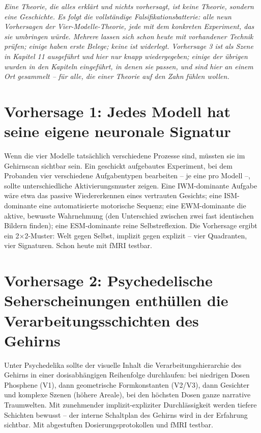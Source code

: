 \documentclass[11pt, twoside, openright]{book}
\begin{document}
\textit{Eine Theorie, die alles erklärt und nichts vorhersagt, ist keine Theorie, sondern eine Geschichte. Es folgt die vollständige Falsifikationsbatterie: alle neun Vorhersagen der Vier-Modelle-Theorie, jede mit dem konkreten Experiment, das sie umbringen würde. Mehrere lassen sich schon heute mit vorhandener Technik prüfen; einige haben erste Belege; keine ist widerlegt. Vorhersage 3 ist als Szene in Kapitel 11 ausgeführt und hier nur knapp wiedergegeben; einige der übrigen wurden in den Kapiteln eingeführt, in denen sie passen, und sind hier an einem Ort gesammelt -- für alle, die einer Theorie auf den Zahn fühlen wollen.}

\section*{Vorhersage 1: Jedes Modell hat seine eigene neuronale Signatur}

Wenn die vier Modelle tatsächlich verschiedene Prozesse sind, müssten sie im Gehirnscan sichtbar sein. Ein geschickt aufgebautes Experiment, bei dem Probanden vier verschiedene Aufgabentypen bearbeiten -- je eine pro Modell --, sollte unterschiedliche Aktivierungsmuster zeigen. Eine IWM-dominante Aufgabe wäre etwa das passive Wiedererkennen eines vertrauten Gesichts; eine ISM-dominante eine automatisierte motorische Sequenz; eine EWM-dominante die aktive, bewusste Wahrnehmung (den Unterschied zwischen zwei fast identischen Bildern finden); eine ESM-dominante reine Selbstreflexion. Die Vorhersage ergibt ein 2×2-Muster: Welt gegen Selbst, implizit gegen explizit -- vier Quadranten, vier Signaturen. Schon heute mit fMRI testbar.

\section*{Vorhersage 2: Psychedelische Seherscheinungen enthüllen die Verarbeitungsschichten des Gehirns}

Unter Psychedelika sollte der visuelle Inhalt die Verarbeitungshierarchie des Gehirns in einer dosisabhängigen Reihenfolge durchlaufen: bei niedrigen Dosen Phosphene (V1), dann geometrische Formkonstanten (V2/V3), dann Gesichter und komplexe Szenen (höhere Areale), bei den höchsten Dosen ganze narrative Traumwelten. Mit zunehmender implizit-expliziter Durchlässigkeit werden tiefere Schichten bewusst -- der interne Schaltplan des Gehirns wird in der Erfahrung sichtbar. Mit abgestuften Dosierungsprotokollen und fMRI testbar.
\end{document}
